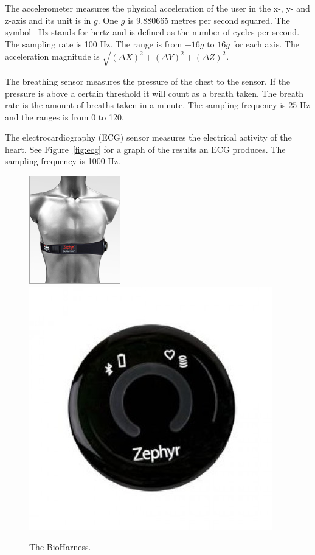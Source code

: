 			The accelerometer measures the physical acceleration of the user in the x-, y- and z-axis and its unit is in $g$. One $g$ is 9.880665 metres per second squared. The symbol \SI{}{\hertz} stands for hertz and is defined as the number of cycles per second. The sampling rate is 100 Hz. The range is from $-16g$ to $16g$ for each axis. The acceleration magnitude is $\sqrt{(\Delta X)^2+(\Delta Y)^2+(\Delta Z)^2}$.

			The breathing sensor measures the pressure of the chest to the sensor. If the pressure is above a certain threshold it will count as a breath taken. The breath rate is the amount of breaths taken in a minute. The sampling frequency is 25 Hz and the ranges is from 0 to 120.

			The electrocardiography (ECG) \cite{ECG} sensor measures the electrical activity of the heart. See Figure~\ref{fig:ecg} for a graph of the results an ECG produces. The sampling frequency is 1000 Hz.

			\begin{figure}[h]
				\centering
					\includegraphics[scale=2.0]{bh.jpg}
					\includegraphics[scale=0.25]{bhclose.jpg}
					
					\caption{The BioHarness.}

			\end{figure}

